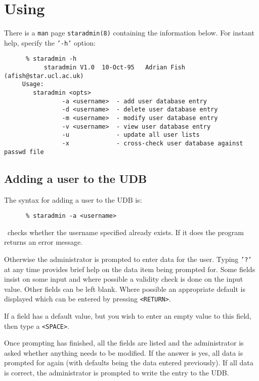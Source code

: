 \section{Using \staradmin}

There is a {\tt man} page {\tt staradmin(8)} containing the information below.
For instant help, specify the {\tt '-h'} option:

\begin{verbatim}
      % staradmin -h
           staradmin V1.0  10-Oct-95   Adrian Fish (afish@star.ucl.ac.uk)
     Usage:
        staradmin <opts>
                -a <username>  - add user database entry
                -d <username>  - delete user database entry
                -m <username>  - modify user database entry
                -v <username>  - view user database entry
                -u             - update all user lists
                -x             - cross-check user database against passwd file
\end{verbatim}

\subsection{Adding a user to the UDB}
\label{addinguser}

The syntax for adding a user to the UDB is:

\begin{verbatim}
      % staradmin -a <username>
\end{verbatim}

\staradmin\ checks whether the username specified already exists. If it does
the program returns an error message. 

Otherwise the administrator is prompted to  enter data for the user. Typing
{\tt '?'} at any time provides brief help on the data item being prompted for.
Some fields insist on some input and where possible a validity check is done on
the input value. Other fields can be left blank. Where possible an appropriate
default is displayed which can be entered by pressing {\tt <RETURN>}. 

If a field has a default value, but you wish to enter an empty value to this
field, then type a {\tt <SPACE>}.

Once prompting has finished, all the fields are listed and the 
administrator is asked whether anything needs to be modified. If the
answer is yes, all data is prompted for again (with defaults being the data
entered previously). If all data is correct, the administrator is prompted 
to write the entry to the UDB.

